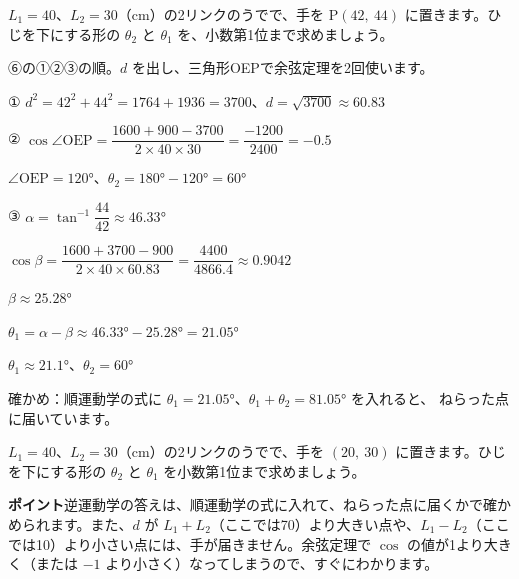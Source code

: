 \begin{reidai}
$L_1=40$、$L_2=30$（cm）の2リンクのうでで、手を $\mathrm{P}(42,\ 44)$ に置きます。ひじを下にする形の $\theta_2$ と $\theta_1$ を、小数第1位まで求めましょう。\par
\kangaekata ⑥の①②③の順。$d$ を出し、三角形OEPで余弦定理を2回使います。\par
\shiki ① $d^2=42^2+44^2=1764+1936=3700$、$d=\sqrt{3700}\approx60.83$\par
\hspace*{2.6\zw}② $\cos\angle\mathrm{OEP}=\dfrac{1600+900-3700}{2\times40\times30}=\dfrac{-1200}{2400}=-0.5$\par
\hspace*{4.6\zw}$\angle\mathrm{OEP}=\ang{120}$、$\theta_2=\ang{180}-\ang{120}=\ang{60}$\par
\hspace*{2.6\zw}③ $\alpha=\tan^{-1}\dfrac{44}{42}\approx\ang{46.33}$\par
\hspace*{4.6\zw}$\cos\beta=\dfrac{1600+3700-900}{2\times40\times60.83}=\dfrac{4400}{4866.4}\approx0.9042$\par
\hspace*{4.6\zw}$\beta\approx\ang{25.28}$\par
\hspace*{4.6\zw}$\theta_1=\alpha-\beta\approx\ang{46.33}-\ang{25.28}=\ang{21.05}$\par
\kotae $\theta_1\approx\ang{21.1}$、$\theta_2=\ang{60}$
\end{reidai}
確かめ：順運動学の式に $\theta_1=\ang{21.05}$、$\theta_1+\theta_2=\ang{81.05}$ を入れると、
ねらった点に届いています。

\begin{jibun}
$L_1=40$、$L_2=30$（cm）の2リンクのうでで、手を $(20,\ 30)$ に置きます。ひじを下にする形の $\theta_2$ と $\theta_1$ を小数第1位まで求めましょう。
\end{jibun}
\textbf{ポイント}\quad 逆運動学の答えは、順運動学の式に入れて、ねらった点に届くかで確かめられます。また、$d$ が $L_1+L_2$（ここでは70）より大きい点や、$L_1-L_2$（ここでは10）より小さい点には、手が届きません。余弦定理で $\cos$ の値が1より大きく（または $-1$ より小さく）なってしまうので、すぐにわかります。

